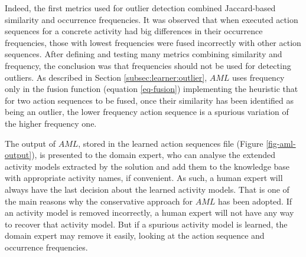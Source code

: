 Indeed, the first metrics used for outlier detection combined Jaccard-based similarity and occurrence frequencies. It was observed that when executed action sequences for a concrete activity had big differences in their occurrence frequencies, those with lowest frequencies were fused incorrectly with other action sequences. After defining and testing many metrics combining similarity and frequency, the conclusion was that frequencies should not be used for detecting outliers. As described in Section \ref{subsec:learner:outlier}, $AML$ uses frequency only in the fusion function (equation \ref{eq-fusion}) implementing the heuristic that for two action sequences to be fused, once their similarity has been identified as being an outlier, the lower frequency action sequence is a spurious variation of the higher frequency one. 

The output of $AML$, stored in the learned action sequences file (Figure \ref{fig-aml-output}), is presented to the domain expert, who can analyse the extended activity models extracted by the solution and add them to the knowledge base with appropriate activity names, if convenient. As such, a human expert will always have the last decision about the learned activity models. That is one of the main reasons why the conservative approach for $AML$ has been adopted. If an activity model is removed incorrectly, a human expert will not have any way to recover that activity model. But if a spurious activity model is learned, the domain expert may remove it easily, looking at the action sequence and occurrence frequencies.